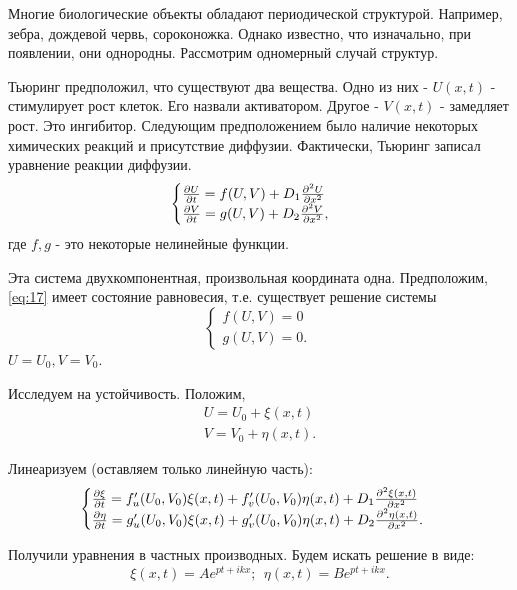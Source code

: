 Многие биологические объекты обладают периодической структурой. Например, зебра, дождевой червь, сороконожка. Однако известно, что изначально, при появлении, они однородны. Рассмотрим одномерный случай структур.

Тьюринг предположил, что существуют два вещества. Одно из них - $U(x,t)$ - стимулирует рост клеток. Его назвали активатором. Другое - $V(x,t)$ - замедляет рост. Это ингибитор. Следующим предположением было наличие некоторых химических реакций и присутствие диффузии. Фактически, Тьюринг записал уравнение реакции диффузии. 
\begin{equation}
\begin{cases}
		\pdv{U}{t}=f(U,V)+D_1 \pdv[2]{U}{x} \\
		\pdv{V}{t}=g(U,V)+D_2 \pdv[2]{V}{x},
	\end{cases}	\
	\label{eq:17}
\end{equation}
где $f,g$  - это некоторые нелинейные функции.

Эта система двухкомпонентная, произвольная координата одна. Предположим, \eqref{eq:17} имеет состояние равновесия, т.е. существует решение системы
\begin{equation}
\begin{cases}
		f(U,V)=0 \\
		g(U,V)=0.
	\end{cases}	\
	\label{eq:18}
\end{equation}
$U=U_0, V=V_0$.

Исследуем на устойчивость. Положим,
\begin{gather*}
	U=U_0+\xi(x,t) \\
	V=V_0+\eta(x,t).
\end{gather*}

Линеаризуем (оставляем только линейную часть):
\begin{equation}
	\begin{cases}
		\pdv{\xi}{t}=f'_u(U_0, V_0)\xi(x,t)+f'_v(U_0, V_0)\eta(x,t)+D_1 \pdv[2]{\xi(x,t)}{x} \\
		\pdv{\eta}{t}=g'_u(U_0, V_0)\xi(x,t)+g'_v(U_0, V_0)\eta(x,t)+D_2 \pdv[2]{\eta(x,t)}{x}.
	\end{cases}	
	\label{eq:19}
\end{equation}

Получили уравнения в частных производных. Будем искать решение в виде:
\begin{equation}
	\xi(x,t)=A e^{pt+ikx};~~\eta(x,t)=B e^{pt+ikx}.
	\label{eq:20}
\end{equation}

